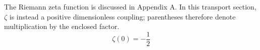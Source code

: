\documentclass{article}
\begin{document}
The Riemann zeta function is discussed in Appendix A.  In this transport
section, $\zeta$ is instead a positive dimensionless coupling; parentheses
therefore denote multiplication by the enclosed factor.
\begin{equation}
  \zeta(0)=-\frac{1}{2}
\end{equation}
\end{document}
